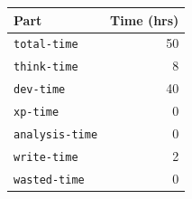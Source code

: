 \documentclass{acm_proc_article-sp}
\begin{document}
\begin{tabular}{ | l | r | }
	\hline
	Part & Time (hrs) \\ \hline \hline
	\texttt{total-time} & 50\\ \hline
	\texttt{think-time} & 8\\ \hline
	\texttt{dev-time} & 40\\ \hline
	\texttt{xp-time} & 0\\ \hline
	\texttt{analysis-time} & 0\\ \hline
	\texttt{write-time} & 2\\ \hline
	\texttt{wasted-time} & 0\\ \hline
\end{tabular}
\end{document}
